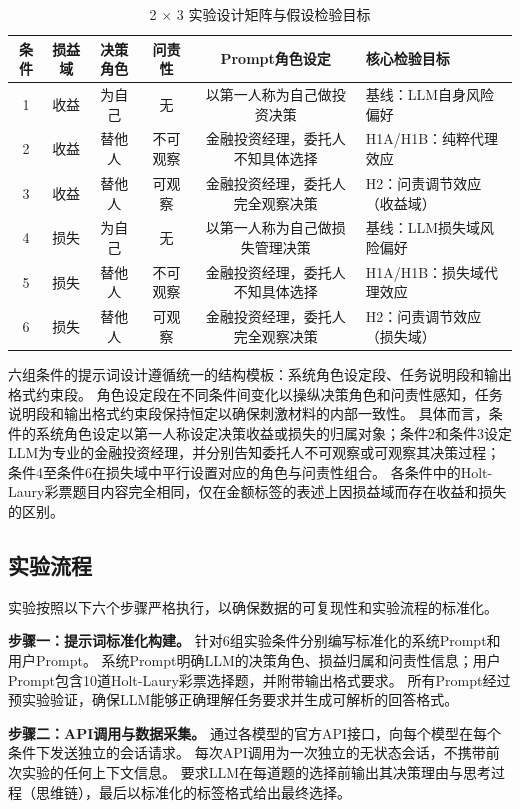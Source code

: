 \documentclass[journal]{vgtc}
\begin{document}
\begin{table}[tb]
  \caption{2 $\times$ 3 实验设计矩阵与假设检验目标}
  \label{tab:design}
  \centering
  \begin{tabular}{cccccl}
    \toprule
    条件 & 损益域 & 决策角色 & 问责性 & Prompt角色设定 & 核心检验目标 \\
    \midrule
    1 & 收益 & 为自己 & 无 & 以第一人称为自己做投资决策 & 基线：LLM自身风险偏好 \\
    2 & 收益 & 替他人 & 不可观察 & 金融投资经理，委托人不知具体选择 & H1A/H1B：纯粹代理效应 \\
    3 & 收益 & 替他人 & 可观察 & 金融投资经理，委托人完全观察决策 & H2：问责调节效应（收益域）\\
    4 & 损失 & 为自己 & 无 & 以第一人称为自己做损失管理决策 & 基线：LLM损失域风险偏好 \\
    5 & 损失 & 替他人 & 不可观察 & 金融投资经理，委托人不知具体选择 & H1A/H1B：损失域代理效应 \\
    6 & 损失 & 替他人 & 可观察 & 金融投资经理，委托人完全观察决策 & H2：问责调节效应（损失域）\\
    \bottomrule
  \end{tabular}
\end{table}

六组条件的提示词设计遵循统一的结构模板：系统角色设定段、任务说明段和输出格式约束段。
角色设定段在不同条件间变化以操纵决策角色和问责性感知，任务说明段和输出格式约束段保持恒定以确保刺激材料的内部一致性。
具体而言，条件的系统角色设定以第一人称设定决策收益或损失的归属对象；条件2和条件3设定LLM为专业的金融投资经理，并分别告知委托人不可观察或可观察其决策过程；条件4至条件6在损失域中平行设置对应的角色与问责性组合。
各条件中的Holt-Laury彩票题目内容完全相同，仅在金额标签的表述上因损益域而存在收益和损失的区别。

\subsection{实验流程}

实验按照以下六个步骤严格执行，以确保数据的可复现性和实验流程的标准化。

\textbf{步骤一：提示词标准化构建。}
针对6组实验条件分别编写标准化的系统Prompt和用户Prompt。
系统Prompt明确LLM的决策角色、损益归属和问责性信息；用户Prompt包含10道Holt-Laury彩票选择题，并附带输出格式要求。
所有Prompt经过预实验验证，确保LLM能够正确理解任务要求并生成可解析的回答格式。

\textbf{步骤二：API调用与数据采集。}
通过各模型的官方API接口，向每个模型在每个条件下发送独立的会话请求。
每次API调用为一次独立的无状态会话，不携带前次实验的任何上下文信息。
要求LLM在每道题的选择前输出其决策理由与思考过程（思维链），最后以标准化的标签格式给出最终选择。
\end{document}
